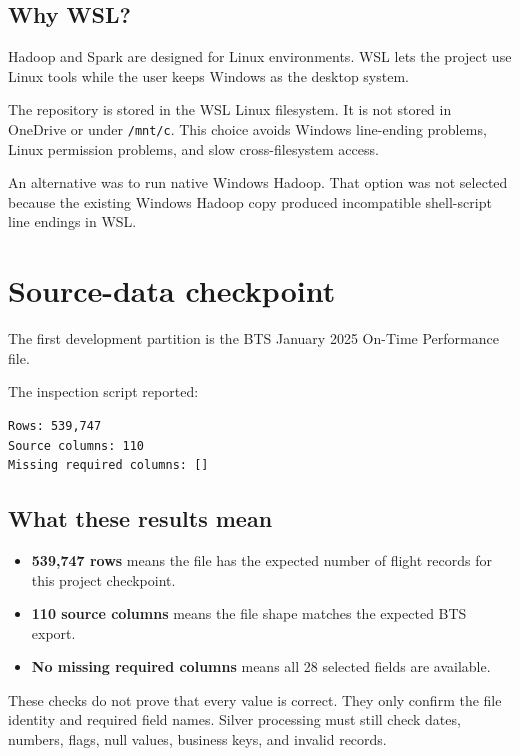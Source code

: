 \documentclass[11pt,a4paper]{article}
\begin{document}
\subsection{Why WSL?}

Hadoop and Spark are designed for Linux environments. WSL lets the project use Linux tools while the user keeps Windows as the desktop system.

The repository is stored in the WSL Linux filesystem. It is not stored in OneDrive or under \texttt{/mnt/c}. This choice avoids Windows line-ending problems, Linux permission problems, and slow cross-filesystem access.

An alternative was to run native Windows Hadoop. That option was not selected because the existing Windows Hadoop copy produced incompatible shell-script line endings in WSL.

\section{Source-data checkpoint}

The first development partition is the BTS January 2025 On-Time Performance file.

The inspection script reported:

\begin{lstlisting}
Rows: 539,747
Source columns: 110
Missing required columns: []
\end{lstlisting}

\subsection{What these results mean}

\begin{itemize}[leftmargin=*]
  \item \textbf{539,747 rows} means the file has the expected number of flight records for this project checkpoint.
  \item \textbf{110 source columns} means the file shape matches the expected BTS export.
  \item \textbf{No missing required columns} means all 28 selected fields are available.
\end{itemize}

These checks do not prove that every value is correct. They only confirm the file identity and required field names. Silver processing must still check dates, numbers, flags, null values, business keys, and invalid records.
\end{document}
